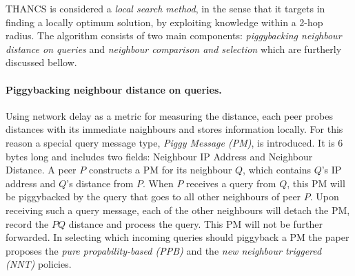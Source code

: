 \documentclass[a4paper,10pt]{article}
\begin{document}
THANCS is considered a \emph{local search method}, in the sense that it targets in finding a locally optimum solution, by exploiting knowledge within a 2-hop radius. The algorithm consists of two main components: \emph{piggybacking neighbour distance on queries} and \emph{neighbour comparison and selection} which are furtherly discussed bellow.

\paragraph*{Piggybacking neighbour distance on queries.}
Using network delay as a metric for measuring the distance, each peer probes distances with its immediate naighbours and stores information locally. For this reason a special query message type, \emph{Piggy Message (PM)}, is introduced. It is 6 bytes long and includes two fields: Neighbour IP Address and Neighbour Distance. A peer $P$ constructs a PM for its neighbour $Q$, which contains $Q$'s IP address and $Q$'s distance from $P$. When $P$ receives a query from $Q$, this PM will be piggybacked by the query that goes to all other neighbours of peer $P$. Upon receiving such a query message, each of the other neighbours will detach the PM, record the $PQ$ distance and process the query. This PM will not be further forwarded. In selecting which incoming queries  should piggyback a PM the paper proposes the \emph{pure propability-based (PPB)} and the \emph{new neighbour triggered (NNT)} policies.
\end{document}
